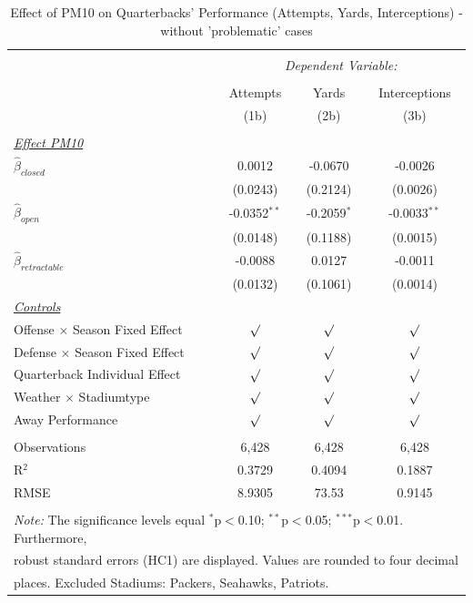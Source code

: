 \documentclass[12pt,a4paper]{article}
\begin{document}
{\begin{table}[!htbp] \centering 
 \caption{Effect of PM10 on Quarterbacks' Performance (Attempts, Yards, Interceptions) - without 'problematic' cases} 
 \label{A:T2} 
\begin{tabular}{@{\extracolsep{5pt}}lccc} 
\hline \\[-1.8ex] 
& \multicolumn{3}{c}{\textit{Dependent Variable:}} \\ \cline{2-4} \\ [-1.8ex]
& Attempts & Yards & Interceptions \\ 
& (1b) & (2b) & (3b)\\ \hline \\[-1.8ex] 
\underline{\textit{Effect PM10}}\\[0.4cm]
$\hat{\beta}_{closed}$& 0.0012 & -0.0670 & -0.0026 \\ 
& (0.0243) & (0.2124)& (0.0026) \\[0.4cm]
$\hat{\beta}_{open}$& -0.0352$^{**}$ & -0.2059$^{*}$ & -0.0033$^{**}$\\ 
& (0.0148) & (0.1188) & (0.0015) \\[0.4cm]
$\hat{\beta}_{retractable}$& -0.0088 & 0.0127 & -0.0011 \\ 
& (0.0132) & (0.1061) & (0.0014)\\ [0.4cm]
\underline{\textit{Controls}} \\[0.4cm]
Offense $\times$ Season Fixed Effect & $\surd$ & $\surd$ & $\surd$ \\[0.4cm]
Defense $\times$ Season Fixed Effect & $\surd$ & $\surd$ & $\surd$ \\[0.4cm]
Quarterback Individual Effect & $\surd$ & $\surd$ & $\surd$ \\[0.4cm]
Weather $\times $ Stadiumtype & $\surd$ & $\surd$ & $\surd$ \\[0.4cm]
Away Performance & $\surd$ & $\surd$ & $\surd$\\
\hline \\[-1.8ex] 
Observations & 6,428 & 6,428 & 6,428 \\ 
R$^{2}$ & 0.3729 & 0.4094 & 0.1887 \\ 
RMSE & 8.9305 & 73.53 & 0.9145 \\ \hline 
\hline \\[-1.8ex] 
\multicolumn{4}{l}{\footnotesize \textit{Note:} The significance levels equal {$^{*}$p$<$0.10; $^{**}$p$<$0.05; $^{***}$p$<$0.01}. Furthermore,} \\ \multicolumn{4}{l}{\footnotesize robust standard errors (HC1) are displayed. Values are rounded to four decimal} \\ \multicolumn{4}{l}{\footnotesize places. Excluded Stadiums: Packers, Seahawks, Patriots.}
 \end{tabular}
\end{table} 


}
\end{document}
